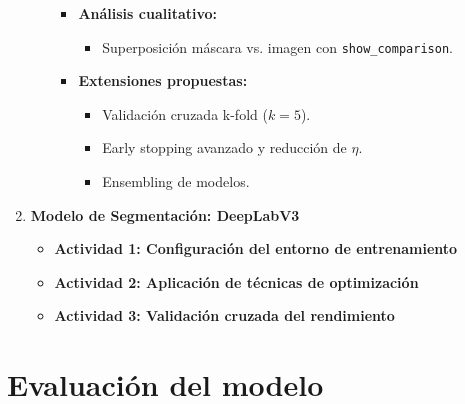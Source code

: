 \begin{enumerate}
\begin{itemize}
\begin{itemize}
    \item \textbf{Análisis cualitativo:}
      \begin{itemize}
        \item Superposición máscara vs. imagen con \texttt{show\_comparison}.
   \end{itemize}
  
    \item \textbf{Extensiones propuestas:}
      \begin{itemize}
        \item Validación cruzada k-fold (\(k=5\)).
        \item Early stopping avanzado y reducción de \(\eta\).
        \item Ensembling de modelos.
      \end{itemize}
  \end{itemize}
  

  \end{itemize}

\item \textbf{Modelo de Segmentación: DeepLabV3}
  \begin{itemize}
  \item\textbf{Actividad 1: Configuración del entorno de entrenamiento}
  \item\textbf{Actividad 2: Aplicación de técnicas de optimización}
  \item\textbf{Actividad 3: Validación cruzada del rendimiento}
  \end{itemize}
\end{enumerate}



\section{Evaluación del modelo}

